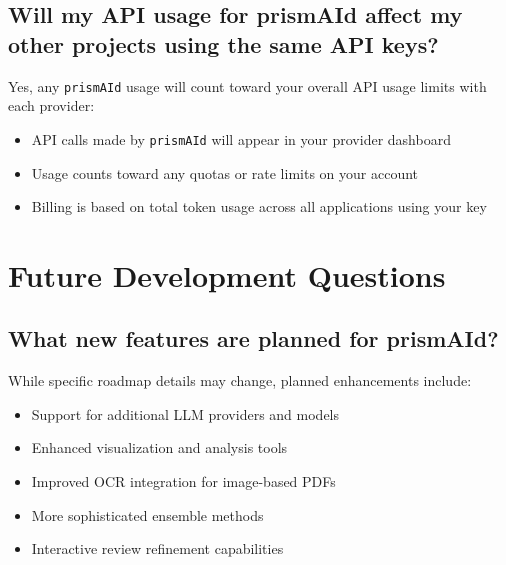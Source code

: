 
\subsection{Will my API usage for prismAId affect my other projects using the same API keys?}

Yes, any \texttt{prismAId} usage will count toward your overall API usage limits with each provider:

\begin{itemize}
    \item API calls made by \texttt{prismAId} will appear in your provider dashboard
    \item Usage counts toward any quotas or rate limits on your account
    \item Billing is based on total token usage across all applications using your key
\end{itemize}


\section{Future Development Questions}

\subsection{What new features are planned for prismAId?}

While specific roadmap details may change, planned enhancements include:

\begin{itemize}
    \item Support for additional LLM providers and models
    \item Enhanced visualization and analysis tools
    \item Improved OCR integration for image-based PDFs
    \item More sophisticated ensemble methods
    \item Interactive review refinement capabilities
\end{itemize}

